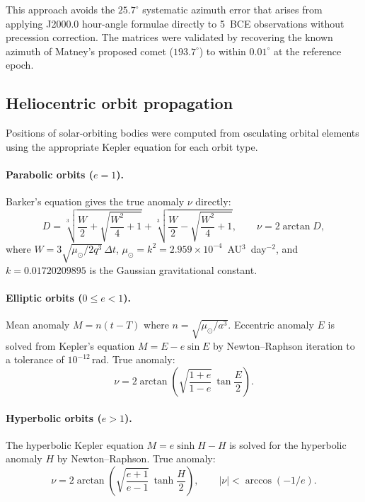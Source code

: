 \documentclass[11pt,a4paper]{article}
\begin{document}
This approach avoids the $25.7^\circ$ systematic azimuth error that arises
from applying J2000.0 hour-angle formulae directly to 5~BCE observations
without precession correction. The matrices were validated by recovering the
known azimuth of Matney's proposed comet\cite{matney2025jbaa} ($193.7^\circ$) to within $0.01^\circ$ at
the reference epoch.

\subsection{Heliocentric orbit propagation}

Positions of solar-orbiting bodies were computed from osculating orbital
elements using the appropriate Kepler equation for each orbit type.

\paragraph{Parabolic orbits ($e = 1$).} Barker's equation gives the true
anomaly $\nu$ directly:
\begin{equation}
  D = \sqrt[3]{\frac{W}{2} + \sqrt{\frac{W^2}{4}+1}}
    + \sqrt[3]{\frac{W}{2} - \sqrt{\frac{W^2}{4}+1}}, \qquad
  \nu = 2\arctan D,
\end{equation}
where $W = 3\sqrt{\mu_\odot/2q^3}\,\Delta t$, $\mu_\odot = k^2 =
2.959\times10^{-4}$~AU$^3$~day$^{-2}$, and $k = 0.01720209895$ is the
Gaussian gravitational constant.

\paragraph{Elliptic orbits ($0 \le e < 1$).} Mean anomaly $M = n(t-T)$
where $n = \sqrt{\mu_\odot/a^3}$. Eccentric anomaly $E$ is solved from
Kepler's equation $M = E - e\sin E$ by Newton--Raphson iteration to a
tolerance of $10^{-12}$\,rad. True anomaly:
\begin{equation}
  \nu = 2\arctan\!\left(\sqrt{\frac{1+e}{1-e}}\,\tan\frac{E}{2}\right).
\end{equation}

\paragraph{Hyperbolic orbits ($e > 1$).} The hyperbolic Kepler equation
$M = e\sinh H - H$ is solved for the hyperbolic anomaly $H$ by
Newton--Raphson. True anomaly:
\begin{equation}
  \nu = 2\arctan\!\left(\sqrt{\frac{e+1}{e-1}}\,\tanh\frac{H}{2}\right),
  \qquad |\nu| < \arccos(-1/e).
\end{equation}
\end{document}
